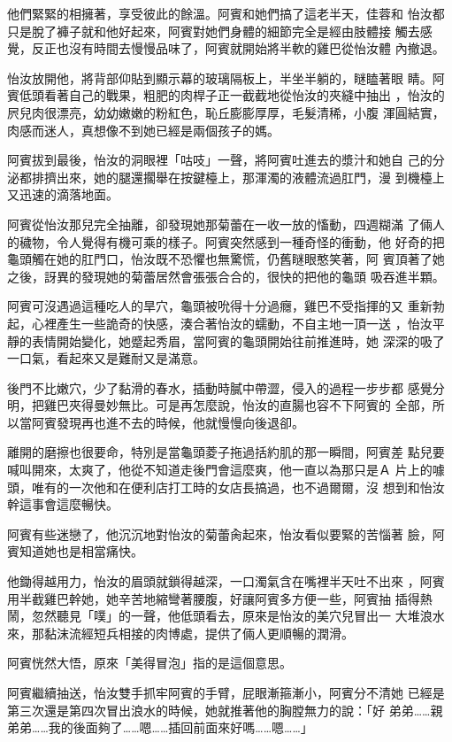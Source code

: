 他們緊緊的相擁著，享受彼此的餘溫。阿賓和她們搞了這老半天，佳蓉和
怡汝都只是脫了褲子就和他好起來，阿賓對她們身體的細節完全是經由肢體接
觸去感覺，反正也沒有時間去慢慢品味了，阿賓就開始將半軟的雞巴從怡汝體
內撤退。

怡汝放開他，將背部仰貼到顯示幕的玻璃隔板上，半坐半躺的，瞇瞌著眼
睛。阿賓低頭看著自己的戰果，粗肥的肉桿子正一截截地從怡汝的夾縫中抽出
，怡汝的屄兒肉很漂亮，幼幼嫩嫩的粉紅色，恥丘膨膨厚厚，毛髮清稀，小腹
渾圓結實，肉感而迷人，真想像不到她已經是兩個孩子的媽。

阿賓拔到最後，怡汝的洞眼裡「咕吱」一聲，將阿賓吐進去的漿汁和她自
己的分泌都排擠出來，她的腿還擱舉在按鍵檯上，那渾濁的液體流過肛門，漫
到機檯上又迅速的滴落地面。

阿賓從怡汝那兒完全抽離，卻發現她那菊蕾在一收一放的慉動，四週糊滿
了倆人的穢物，令人覺得有機可乘的樣子。阿賓突然感到一種奇怪的衝動，他
好奇的把龜頭觸在她的肛門口，怡汝既不恐懼也無驚慌，仍舊瞇眼憨笑著，阿
賓頂著了她之後，訝異的發現她的菊蕾居然會張張合合的，很快的把他的龜頭
吸吞進半顆。

阿賓可沒遇過這種吃人的旱穴，龜頭被吮得十分過癮，雞巴不受指揮的又
重新勃起，心裡產生一些詭奇的快感，湊合著怡汝的蠕動，不自主地一頂一送
，怡汝平靜的表情開始變化，她蹙起秀眉，當阿賓的龜頭開始往前推進時，她
深深的吸了一口氣，看起來又是難耐又是滿意。

後門不比嫩穴，少了黏滑的春水，插動時膩中帶澀，侵入的過程一步步都
感覺分明，把雞巴夾得曼妙無比。可是再怎麼說，怡汝的直腸也容不下阿賓的
全部，所以當阿賓發現再也進不去的時候，他就慢慢向後退卻。

離開的磨擦也很要命，特別是當龜頭菱子拖過括約肌的那一瞬間，阿賓差
點兒要喊叫開來，太爽了，他從不知道走後門會這麼爽，他一直以為那只是Ａ
片上的噱頭，唯有的一次他和在便利店打工時的女店長搞過，也不過爾爾，沒
想到和怡汝幹這事會這麼暢快。

阿賓有些迷戀了，他沉沉地對怡汝的菊蕾肏起來，怡汝看似要緊的苦惱著
臉，阿賓知道她也是相當痛快。

他鋤得越用力，怡汝的眉頭就鎖得越深，一口濁氣含在嘴裡半天吐不出來
，阿賓用半截雞巴幹她，她辛苦地縮彎著腰腹，好讓阿賓多方便一些，阿賓抽
插得熱鬧，忽然聽見「噗」的一聲，他低頭看去，原來是怡汝的美穴兒冒出一
大堆浪水來，那黏沫流經短兵相接的肉博處，提供了倆人更順暢的潤滑。

阿賓恍然大悟，原來「美得冒泡」指的是這個意思。

阿賓繼續抽送，怡汝雙手抓牢阿賓的手臂，屁眼漸箍漸小，阿賓分不清她
已經是第三次還是第四次冒出浪水的時候，她就推著他的胸膛無力的說：「好
弟弟……親弟弟……我的後面夠了……嗯……插回前面來好嗎……嗯……」

